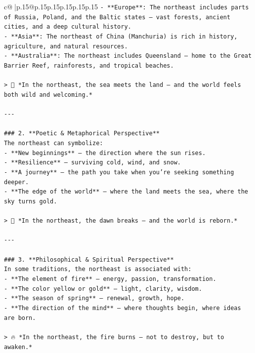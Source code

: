 \documentclass{article}
\begin{document}
{\begin{supertabular}{c@{$\;$}|p{.15\linewidth}@{}p{.15\linewidth}p{.15\linewidth}p{.15\linewidth}p{.15\linewidth}p{.15\linewidth}}
{{{\texttt{{-} **Europe**: The northeast includes parts of Russia, Poland, and the Baltic states — vast forests, ancient cities, and a deep cultural history.} \\
\texttt{{-} **Asia**: The northeast of China (Manchuria) is rich in history, agriculture, and natural resources.} \\
\texttt{{-} **Australia**: The northeast includes Queensland — home to the Great Barrier Reef, rainforests, and tropical beaches.} \\
\\ 
\texttt{> 🌊 *In the northeast, the sea meets the land — and the world feels both wild and welcoming.*} \\
\\ 
\texttt{{-}{-}{-}} \\
\\ 
\texttt{\#\#\# 2. **Poetic \& Metaphorical Perspective**  } \\
\texttt{The northeast can symbolize:} \\
\texttt{{-} **New beginnings** — the direction where the sun rises.} \\
\texttt{{-} **Resilience** — surviving cold, wind, and snow.} \\
\texttt{{-} **A journey** — the path you take when you’re seeking something deeper.} \\
\texttt{{-} **The edge of the world** — where the land meets the sea, where the sky turns gold.} \\
\\ 
\texttt{> 🌅 *In the northeast, the dawn breaks — and the world is reborn.*} \\
\\ 
\texttt{{-}{-}{-}} \\
\\ 
\texttt{\#\#\# 3. **Philosophical \& Spiritual Perspective**  } \\
\texttt{In some traditions, the northeast is associated with:} \\
\texttt{{-} **The element of fire** — energy, passion, transformation.} \\
\texttt{{-} **The color yellow or gold** — light, clarity, wisdom.} \\
\texttt{{-} **The season of spring** — renewal, growth, hope.} \\
\texttt{{-} **The direction of the mind** — where thoughts begin, where ideas are born.} \\
\\ 
\texttt{> 🔥 *In the northeast, the fire burns — not to destroy, but to awaken.*} \\
}}}
\end{supertabular}}
\end{document}
